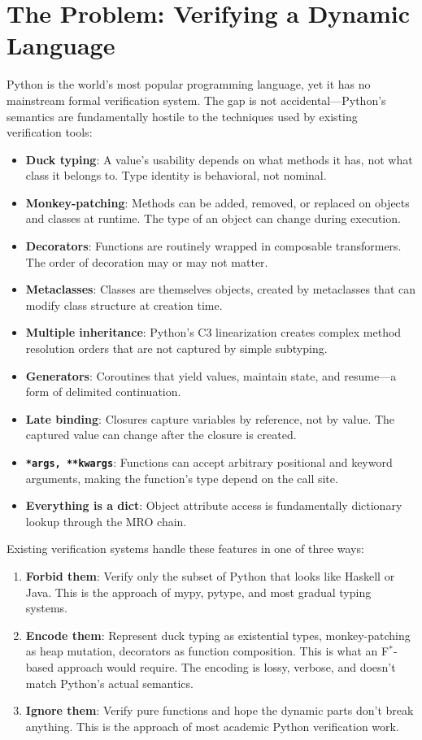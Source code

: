\documentclass[11pt,a4paper]{report}
\theoremstyle{definition}
\theoremstyle{plain}
\newcommand{\fstar}{F$^{*}$}
\begin{document}
\section{The Problem: Verifying a Dynamic Language}

Python is the world's most popular programming language, yet it has no
mainstream formal verification system. The gap is not accidental---Python's
semantics are fundamentally hostile to the techniques used by existing
verification tools:

\begin{itemize}
  \item \textbf{Duck typing}: A value's usability depends on what methods it has,
    not what class it belongs to. Type identity is behavioral, not nominal.
  \item \textbf{Monkey-patching}: Methods can be added, removed, or replaced on
    objects and classes at runtime. The type of an object can change during execution.
  \item \textbf{Decorators}: Functions are routinely wrapped in composable
    transformers. The order of decoration may or may not matter.
  \item \textbf{Metaclasses}: Classes are themselves objects, created by metaclasses
    that can modify class structure at creation time.
  \item \textbf{Multiple inheritance}: Python's C3 linearization creates complex
    method resolution orders that are not captured by simple subtyping.
  \item \textbf{Generators}: Coroutines that yield values, maintain state, and
    resume---a form of delimited continuation.
  \item \textbf{Late binding}: Closures capture variables by reference, not by
    value. The captured value can change after the closure is created.
  \item \textbf{\texttt{*args, **kwargs}}: Functions can accept arbitrary
    positional and keyword arguments, making the function's type depend on the
    call site.
  \item \textbf{Everything is a dict}: Object attribute access is fundamentally
    dictionary lookup through the MRO chain.
\end{itemize}

Existing verification systems handle these features in one of three ways:

\begin{enumerate}
  \item \textbf{Forbid them}: Verify only the subset of Python that looks like
    Haskell or Java. This is the approach of mypy, pytype, and most gradual
    typing systems.
  \item \textbf{Encode them}: Represent duck typing as existential types, monkey-patching
    as heap mutation, decorators as function composition. This is what an \fstar{}-based
    approach would require. The encoding is lossy, verbose, and doesn't match
    Python's actual semantics.
  \item \textbf{Ignore them}: Verify pure functions and hope the dynamic parts
    don't break anything. This is the approach of most academic Python verification
    work.
\end{enumerate}
\end{document}
